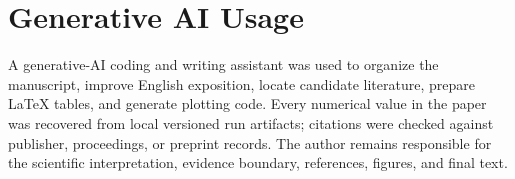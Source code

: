 
\section{Generative AI Usage}

A generative-AI coding and writing assistant was used to organize the
manuscript, improve English exposition, locate candidate literature, prepare
\LaTeX{} tables, and generate plotting code. Every numerical value in the
paper was recovered from local versioned run artifacts; citations were checked
against publisher, proceedings, or preprint records. The author remains
responsible for the scientific interpretation, evidence boundary, references,
figures, and final text.
